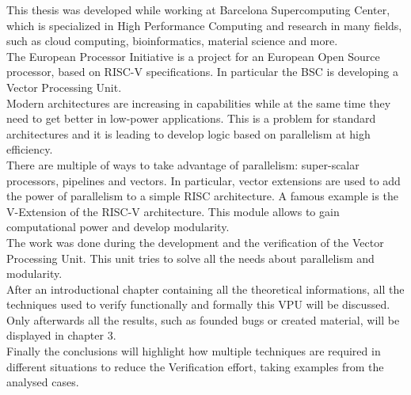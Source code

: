 \summary
\english

This thesis was developed while working at Barcelona Supercomputing Center, which is specialized in High Performance Computing and research in many fields, such as cloud computing, bioinformatics, material science and more.\\

The European Processor Initiative is a project for an European Open Source processor, based on RISC-V specifications. In particular the BSC is developing a Vector Processing Unit.\\
 
Modern architectures are increasing in capabilities while at the same time they need to get better in low-power applications.
This  is a problem for standard architectures and it is leading to develop logic based on parallelism at high efficiency.\\

There are multiple of ways to take advantage of parallelism: super-scalar processors, pipelines and vectors. In particular, vector extensions are used to add the power of parallelism to a simple RISC architecture. A famous example is the V-Extension of the RISC-V architecture. This module allows to gain computational power and develop modularity.\\

The work was done during the development and the verification of the Vector Processing Unit. This unit tries to solve all the needs about parallelism and modularity.\\

After an introductional chapter containing all the theoretical informations, all the techniques used to verify functionally and formally this VPU will be discussed.\\
Only afterwards all the results, such as founded bugs or created material, will be displayed in chapter 3.\\

Finally the conclusions will highlight how multiple techniques are required in different situations to reduce the Verification effort, taking examples from the analysed cases.








\bigskip
